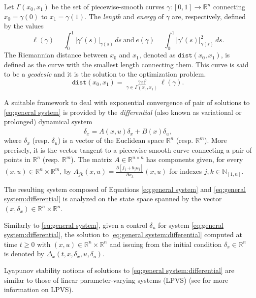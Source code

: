 \documentclass[10pt,twocolumn,twoside]{IEEEtran}
\theoremstyle{plain}
\theoremstyle{definition}
\theoremstyle{remark}
\begin{document}
Let $\Gamma(x_0,x_1)$ be the set of piecewise-smooth curves $\gamma:[0,1]\to\mathbb{R}^n$ connecting $x_0=\gamma(0)$ to $x_1=\gamma(1)$. The \emph{length} and \emph{energy} of $\gamma$ are, respectively, defined by the values
\begin{equation*}
	\ell(\gamma)=\int_0^1|\gamma'(s)|_{\gamma(s)}\,ds\ \text{and}\ e(\gamma)=\int_0^1|\gamma'(s)|_{\gamma(s)}^2\,ds.
\end{equation*}
The Riemannian distance between $x_0$ and $x_1$, denoted as $\mathbin{\mathtt{dist}}(x_0,x_1)$, is defined as the curve with the smallest length connecting them. This curve is said to be a \emph{geodesic} and it is the solution to the optimization problem.
\begin{equation}\label{eq:geodesic formulation}
	\mathbin{\mathtt{dist}}(x_0,x_1)=\inf_{\gamma\in\Gamma(x_0,x_1)}\ell(\gamma).
\end{equation}

A suitable framework to deal with exponential convergence of pair of solutions to \eqref{eq:general system} is provided by the \emph{differential} (also known as variational or prolonged) dynamical system
\begin{equation}\label{eq:general system:differential}
	\dot{\delta}_x=A(x,u)\delta_x+B(x)\delta_u,
\end{equation}
where $\delta_x$ (resp. $\delta_u$) is a vector of the Euclidean space $\mathbb{R}^n$ (resp. $\mathbb{R}^m$). More precisely, it is the vector tangent to a piecewise smooth curve connecting a pair of points in $\mathbb{R}^n$ (resp. $\mathbb{R}^m$). The matrix $A\in\mathbb{R}^{n\times n}$ has components given, for every $(x,u)\in\mathbb{R}^n\times\mathbb{R}^m$, by $A_{jk}(x,u)=\tfrac{\partial[f_j+b_ju_j]}{\partial x_k}(x,u)$
for indexes $j,k\in\mathbb{N}_{[1,n]}$. 

The resulting system composed of Equations \eqref{eq:general system} and \eqref{eq:general system:differential} is analyzed on the state space spanned by the vector $(x,\delta_x)\in\mathbb{R}^n\times\mathbb{R}^n$. 

Similarly to \eqref{eq:general system}, given a control $\delta_u$ for system \eqref{eq:general system:differential}, the solution to \eqref{eq:general system:differential} computed at time $t\geq0$ with $(x,u)\in\mathbb{R}^n\times\mathbb{R}^n$ and issuing from the  initial condition $\delta_x\in\mathbb{R}^n$ is denoted by $\Delta_x(t,x,\delta_x,u,\delta_u)$. 

Lyapunov stability notions of solutions to \eqref{eq:general system:differential} are similar to those of linear parameter-varying systems (LPVS) (see \cite[Ch. 2 and 3]{Briat2015} for more information on LPVS). 
\end{document}
